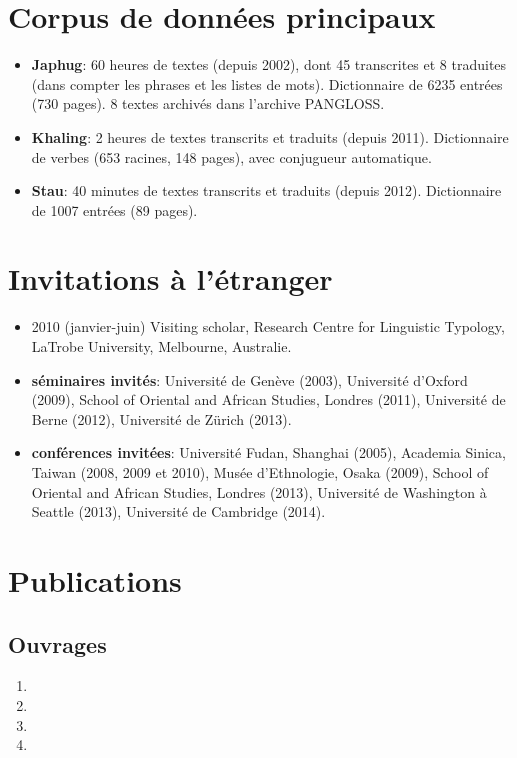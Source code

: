 \documentclass[oldfontcommands,oneside,a4paper,11pt]{article}
\begin{document}
\section*{Corpus de données principaux}
\begin{itemize}
\item \textbf{Japhug}: 60 heures de textes (depuis 2002), dont 45 transcrites et 8 traduites (dans compter les phrases et les listes de mots). Dictionnaire de 6235 entrées (730 pages). 8 textes archivés dans l'archive PANGLOSS.
\item \textbf{Khaling}: 2 heures de textes transcrits et traduits (depuis 2011). Dictionnaire de verbes (653 racines, 148 pages), avec conjugueur automatique.
\item \textbf{Stau}: 40 minutes de textes transcrits et traduits (depuis 2012). Dictionnaire de 1007 entrées (89 pages).
  \end{itemize}
  
 
  
\section*{Invitations à l'étranger}
\begin{itemize}
\item   2010 (janvier-juin) Visiting scholar, Research Centre for Linguistic Typology, LaTrobe University, Melbourne, Australie.
 \item   \textbf{séminaires invités}:  Université de Genève (2003),  Université d'Oxford (2009), School of Oriental and African Studies, Londres (2011), Université de Berne (2012),  Université de Zürich (2013).
 \item \textbf{conférences invitées}: Université Fudan, Shanghai (2005), Academia Sinica, Taiwan (2008, 2009 et 2010), Musée d'Ethnologie, Osaka (2009), School of Oriental and African Studies, Londres (2013), Université de Washington à Seattle (2013),  Université de Cambridge (2014).
  \end{itemize}
    
\section*{Publications}
  \subsection*{Ouvrages}
  \begin{enumerate}

 \item  {}
\item {}
   \item {}
  \item  {}
     
\end{enumerate}
\end{document}
